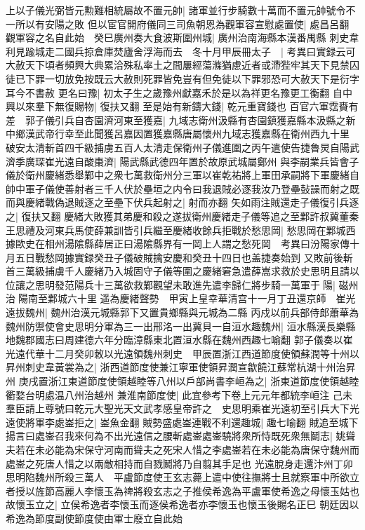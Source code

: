 上以子儀光弼皆元勲難相統屬故不置元帥|{
	諸軍並行步騎數十萬而不置元帥號令不一所以有安陽之敗}
但以宦官開府儀同三司魚朝恩為觀軍容宣慰處置使|{
	處昌呂翻}
觀軍容之名自此始　癸巳廣州奏大食波斯圍州城|{
	廣州治南海縣本漢番禺縣}
刺史韋利見踰城走二國兵掠倉庫焚廬舍浮海而去　冬十月甲辰冊太子　|{
	考異曰實録云可大赦天下頃者頻興大典累洽殊私率土之間屢經蕩滌猶慮近者或滯狴牢其天下見禁囚徒已下罪一切放免按既云大赦則死罪皆免豈有但免徒以下罪邪恐可大赦天下是衍字耳今不書赦}
更名曰豫|{
	初太子生之歲豫州獻嘉禾於是以為祥更名豫更工衡翻}
自中興以來羣下無復賜物|{
	復扶又翻}
至是始有新鑄大錢|{
	乾元重寶錢也}
百官六軍霑賚有差　郭子儀引兵自杏園濟河東至獲嘉|{
	九域志衛州汲縣有杏園鎮獲嘉縣本汲縣之新中鄉漢武帝行幸至此聞獲呂嘉因置獲嘉縣唐屬懷州九域志獲嘉縣在衛州西九十里}
破安太清斬首四千級捕虜五百人太清走保衛州子儀進圍之丙午遣使告捷魯炅自陽武濟季廣琛崔光遠自酸棗濟|{
	陽武縣武德四年置於故原武城屬鄭州}
與李嗣業兵皆會子儀於衛州慶緒悉舉鄴中之衆七萬救衛州分三軍以崔乾祐將上軍田承嗣將下軍慶緒自帥中軍子儀使善射者三千人伏於壘垣之内令曰我退賊必逐我汝乃登壘鼔譟而射之既而與慶緒戰偽退賊逐之至壘下伏兵起射之|{
	射而亦翻}
矢如雨注賊還走子儀復引兵逐之|{
	復扶又翻}
慶緒大敗獲其弟慶和殺之遂拔衛州慶緒走子儀等追之至鄴許叔冀董秦王思禮及河東兵馬使薛兼訓皆引兵繼至慶緒收餘兵拒戰於愁思岡|{
	愁思岡在鄴城西據歐史在相州湯隂縣薛居正曰湯隂縣界有一岡上人謂之愁死岡　考異曰汾陽家傳十月五日戰愁岡據實録癸丑子儀破賊擒安慶和癸丑十四日也盖捷奏始到}
又敗前後斬首三萬級捕虜千人慶緒乃入城固守子儀等圍之慶緒窘急遣薛嵩求救於史思明且請以位讓之思明發范陽兵十三萬欲救鄴觀望未敢進先遣李歸仁將步騎一萬軍于陽|{
	磁州治陽南至鄴城六十里}
遥為慶緒聲勢　甲寅上皇幸華清宫十一月丁丑還京師　崔光遠拔魏州|{
	魏州治漢元城縣郭下又置貴鄉縣與元城為二縣}
丙戍以前兵部侍郎蕭華為魏州防禦使會史思明分軍為三一出邢洺一出冀貝一自洹水趣魏州|{
	洹水縣漢長樂縣地魏郡國志曰周建德六年分臨漳縣東北置洹水縣在魏州西趣七喻翻}
郭子儀奏以崔光遠代華十二月癸卯敇以光遠領魏州刺史　甲辰置浙江西道節度使領蘇潤等十州以昇州刺史韋黃裳為之|{
	浙西道節度使兼江寧軍使領昇潤宣歙饒江蘇常杭湖十州治昇州}
庚戌置浙江東道節度使領越睦等八州以戶部尚書李峘為之|{
	浙東道節度使領越睦衢婺台明處温八州治越州}
兼淮南節度使|{
	此宜參考下卷上元元年都統李峘注}
己未羣臣請上尊號曰乾元大聖光天文武孝感皇帝許之　史思明乘崔光遠初至引兵大下光遠使將軍李處崟拒之|{
	崟魚金翻}
賊勢盛處崟連戰不利還趣城|{
	趣七喻翻}
賊追至城下揚言曰處崟召我來何為不出光遠信之腰斬處崟處崟驍將衆所恃既死衆無鬬志|{
	姚聳夫若在未必能為宋保守河南而聳夫之死宋人惜之李處崟若在未必能為唐保守魏州而處崟之死唐人惜之以兩敵相持而自戮鬭將乃自翦其手足也}
光遠脫身走還汴州丁卯思明陷魏州所殺三萬人　平盧節度使王玄志薨上遣中使往撫將士且就察軍中所欲立者授以旌節高麗人李懷玉為禆將殺玄志之子推侯希逸為平盧軍使希逸之母懷玉姑也故懷玉立之|{
	立侯希逸者李懷玉而逐侯希逸者亦李懷玉也懷玉後賜名正巳}
朝廷因以希逸為節度副使節度使由軍士廢立自此始

